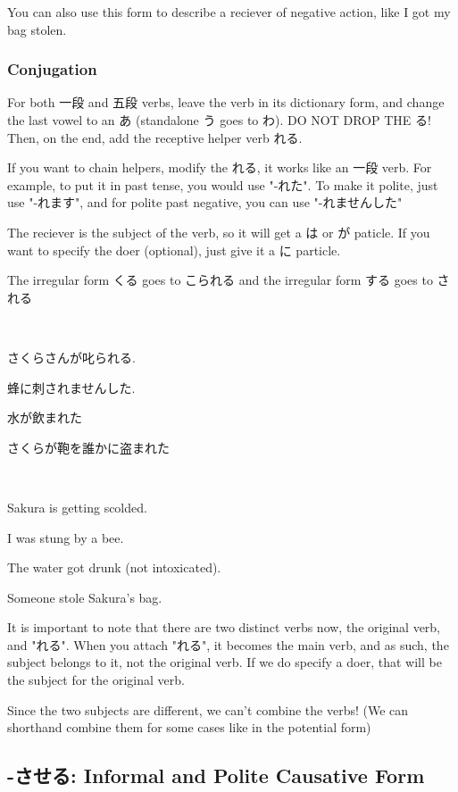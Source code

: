 \documentclass{article}
\begin{document}
\begin{CJK}{UTF8}{min}
You can also use this form to describe a reciever of negative action, like I got my bag stolen.

\subsubsection{Conjugation}

For both 一段 and 五段 verbs, leave the verb in its dictionary form, and change the last vowel to an あ (standalone う goes to わ). DO NOT DROP THE る! Then, on the end, add the receptive helper verb れる. 

If you want to chain helpers, modify the れる, it works like an 一段 verb. For example, to put it in past tense, you would use "-れた". To make it polite, just use "-れます", and for polite past negative, you can use "-れませんした"

The reciever is the subject of the verb, so it will get a は or が paticle. If you want to specify the doer (optional), just give it a に particle.

The irregular form くる goes to こられる and the irregular form する goes to される
\begin{example}
\ 

さくらさんが叱られる.

蜂に刺されませんした.

水が飲まれた

さくらが鞄を誰かに盗まれた
\end{example}

\begin{solution}
\ 

Sakura is getting scolded.

I was stung by a bee.

The water got drunk (not intoxicated).

Someone stole Sakura's bag.
\end{solution}

It is important to note that there are two distinct verbs now, the original verb, and "れる". When you attach "れる", it becomes the main verb, and as such, the subject belongs to it, not the original verb. If we do specify a doer, that will be the subject for the original verb. 

Since the two subjects are different, we can't combine the verbs! (We can shorthand combine them for some cases like in the potential form) 

\subsection{-させる: Informal and Polite Causative Form}


\end{CJK}
\end{document}
